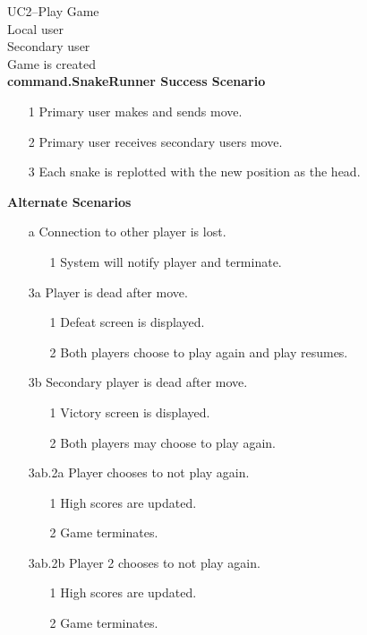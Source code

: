 \documentclass[titlepage]{article}
\begin{document}
	\textbf{} UC2--Play Game\\
	\textbf{} Local user\\
	\textbf{} Secondary user\\
	\textbf{} Game is created\\
	\textbf{command.SnakeRunner Success Scenario}
	\begin{enumerate}
		\itemsep0em 
		\item[1] Primary user makes and sends move.
		\item[2] Primary user receives secondary users move.
		\item[3] Each snake is replotted with the new position as the head.
	\end{enumerate}
	\textbf{Alternate Scenarios}
	\begin{enumerate}
		\itemsep0em 
		\item[a]Connection to other player is lost.
		\begin{enumerate}
			\itemsep0em 
			\item[1]System will notify player and terminate.
		\end{enumerate}
		\item[3a]Player is dead after move.
		\begin{enumerate}
			\itemsep0em 
			\item[1]Defeat screen is displayed.
			\item[2]Both players choose to play again and play resumes.
		\end{enumerate}
		\item[3b]Secondary player is dead after move.
		\begin{enumerate}
			\itemsep0em 
			\item[1]Victory screen is displayed.
			\item[2]Both players may choose to play again.
		\end{enumerate}
				\item[3ab.2a]Player chooses to not play again.
				\begin{enumerate}
					\itemsep0em 
					\item[1]High scores are updated.
					\item[2]Game terminates.
				\end{enumerate}
				\item[3ab.2b]Player 2 chooses to not play again.
				\begin{enumerate}
					\itemsep0em 
					\item[1]High scores are updated.
					\item[2]Game terminates.
				\end{enumerate}
	\end{enumerate}
		
\end{document}
